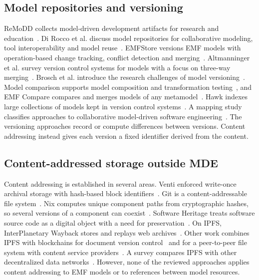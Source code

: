 \documentclass[iicol,pdflatex,sn-mathphys-num]{sn-jnl}
\theoremstyle{thmstylethree}%
\begin{document}
\subsection{Model repositories and versioning}\label{sec:related-versioning}

ReMoDD collects model-driven development artifacts for research and education~\cite{france2007remodd}. Di Rocco et al. discuss model repositories for collaborative modeling, tool interoperability and model reuse~\cite{dirocco2015repositories}. EMFStore versions EMF models with operation-based change tracking, conflict detection and merging~\cite{koegel2010emfstore}. Altmanninger et al. survey version control systems for models with a focus on three-way merging~\cite{altmanninger2009survey}. Brosch et al. introduce the research challenges of model versioning~\cite{brosch2012versioning}. Model comparison supports model composition and transformation testing~\cite{kolovos2006comparison}, and EMF Compare compares and merges models of any metamodel~\cite{emfcompare}. Hawk indexes large collections of models kept in version control systems~\cite{barmpis2013hawk}. A mapping study classifies approaches to collaborative model-driven software engineering~\cite{franzago2018collaborative}. The versioning approaches record or compute differences between versions. Content addressing instead gives each version a fixed identifier derived from the content.

\subsection{Content-addressed storage outside MDE}\label{sec:related-content}

Content addressing is established in several areas. Venti enforced write-once archival storage with hash-based block identifiers~\cite{quinlan2002venti}. Git is a content-addressable file system~\cite{chacon2014progit}. Nix computes unique component paths from cryptographic hashes, so several versions of a component can coexist~\cite{dolstra2004nix}. Software Heritage treats software source code as a digital object with a need for preservation~\cite{dicosmo2017heritage}. On IPFS, InterPlanetary Wayback stores and replays web archives~\cite{kelly2016wayback}. Other work combines IPFS with blockchains for document version control~\cite{nizamuddin2019document} and for a peer-to-peer file system with content service providers~\cite{chen2017improved}. A survey compares IPFS with other decentralized data networks~\cite{daniel2022ipfsfriends}. However, none of the reviewed approaches applies content addressing to EMF models or to references between model resources.
\end{document}
